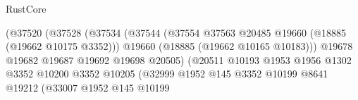 \begin{lexlean}{RustCore}
\begin{coremodule}
                                                        (@37520
                                                          (@37528
                                                            (@37534
                                                              (@37544
                                                                (@37554
                                                                  @37563
                                                                  @20485
                                                                  @19660
                                                                  (@18885 (@19662 @10175 @3352)))
                                                                @19660
                                                                (@18885 (@19662 @10165 @10183)))
                                                              @19678
                                                              @19682
                                                              @19687
                                                              @19692
                                                              @19698
                                                              @20505)
                                                            (@20511
                                                              @10193
                                                              @1953
                                                              @1956
                                                              @1302
                                                              @3352
                                                              @10200
                                                              @3352
                                                              @10205
                                                              (@32999
                                                                @1952
                                                                @145
                                                                @3352
                                                                @10199
                                                                @8641
                                                                @19212
                                                                (@33007
                                                                  @1952
                                                                  @145
                                                                  @10199

\end{coremodule}
\end{lexlean}
